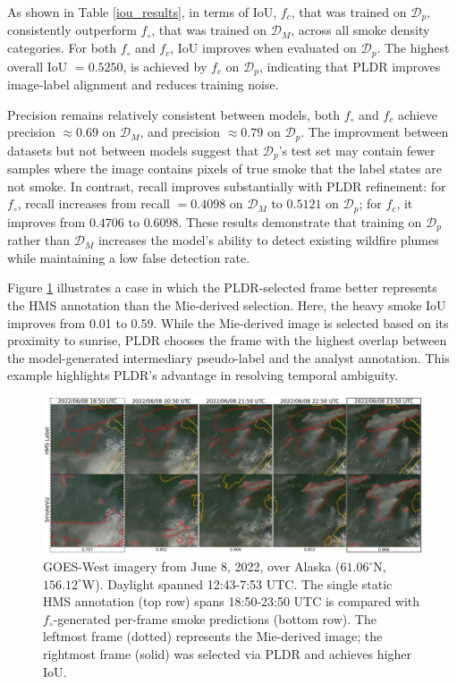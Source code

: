 \documentclass{article}
\begin{document}
As shown in Table \ref{iou_results}, in terms of IoU, \(f_c\), that was trained on \(\mathcal{D}_p\), consistently outperform \(f_{\circ}\), that was trained on \( \mathcal{D}_M \), across all smoke density categories. For both \(f_{\circ}\) and \(f_c\), IoU improves when evaluated on \(\mathcal{D}_p\). The highest overall IoU \(= 0.5250 \), is achieved by \( f_c \) on \( \mathcal{D}_p \), indicating that PLDR improves image-label alignment and reduces training noise.

Precision remains relatively consistent between models, both \( f_{\circ} \) and \( f_c \) achieve precision \(\approx 0.69 \) on \( \mathcal{D}_M \), and precision \(\approx 0.79 \) on \( \mathcal{D}_p \). The improvment between datasets but not between models suggest that \(\mathcal{D}_p\)'s test set may contain fewer samples where the image contains pixels of true smoke that the label states are not smoke. In contrast, recall improves substantially with PLDR refinement: for \( f_{\circ}\), recall increases from recall \( = 0.4098 \) on \( \mathcal{D}_M \) to \( 0.5121 \) on \( \mathcal{D}_p \); for \( f_c \), it improves from \( 0.4706 \) to \( 0.6098 \). These results demonstrate that training on \(\mathcal{D}_p\) rather than \(\mathcal{D}_M\) increases the model’s ability to detect existing wildfire plumes while maintaining a low false detection rate.

Figure \ref{ml_vs_mei} illustrates a case in which the PLDR-selected frame better represents the HMS annotation than the Mie-derived selection. Here, the heavy smoke IoU improves from 0.01 to 0.59. While the Mie-derived image is selected based on its proximity to sunrise, PLDR chooses the frame with the highest overlap between the model-generated intermediary pseudo-label and the analyst annotation. This example highlights PLDR’s advantage in resolving temporal ambiguity.

\begin{figure}[!htb] 
    \centering
    \includegraphics[width=\linewidth]{figures/final_results_small.png}
        \caption{GOES-West imagery from June 8, 2022, over Alaska (\(61.06^{\circ}\)N, \(156.12^{\circ}\)W). Daylight spanned 12:43-7:53 UTC. The single static HMS annotation (top row) spans 18:50-23:50 UTC is compared with \(f_{\circ}\)-generated per-frame smoke predictions (bottom row). The leftmost frame (dotted) represents the Mie-derived image; the rightmost frame (solid) was selected via PLDR and achieves higher IoU.}

    \label{ml_vs_mei}
\end{figure}
\end{document}
